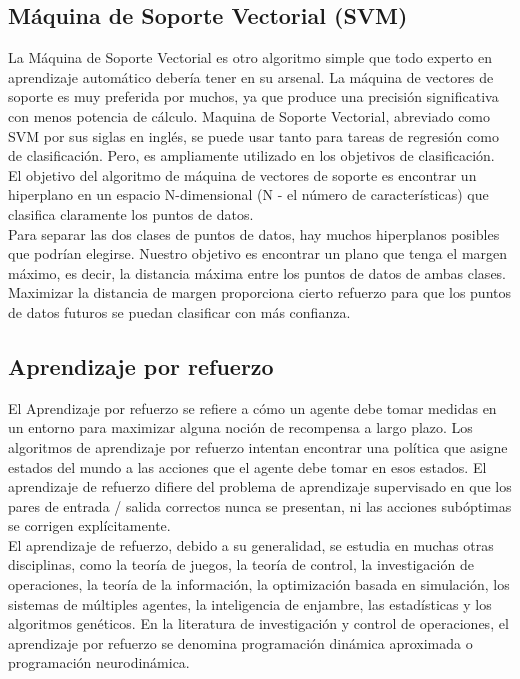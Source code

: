 \subsection{Máquina  de Soporte Vectorial (SVM)}
\noindent La Máquina de Soporte Vectorial es otro algoritmo simple que todo experto en aprendizaje automático debería tener en su arsenal. La máquina de vectores de soporte es muy preferida por muchos, ya que produce una precisión significativa con menos potencia de cálculo. Maquina de Soporte Vectorial, abreviado como SVM por sus siglas en inglés, se puede usar tanto para tareas de regresión como de clasificación. Pero, es ampliamente utilizado en los objetivos de clasificación. El objetivo del algoritmo de máquina de vectores de soporte es encontrar un hiperplano en un espacio N-dimensional (N - el número de características) que clasifica claramente los puntos de datos.\\

\noindent Para separar las dos clases de puntos de datos, hay muchos hiperplanos posibles que podrían elegirse. Nuestro objetivo es encontrar un plano que tenga el margen máximo, es decir, la distancia máxima entre los puntos de datos de ambas clases. Maximizar la distancia de margen proporciona cierto refuerzo para que los puntos de datos futuros se puedan clasificar con más confianza\cite{12}.\\
\subsection{Aprendizaje por refuerzo}
\noindent El Aprendizaje por refuerzo se refiere a cómo un agente debe tomar medidas en un entorno para maximizar alguna noción de recompensa a largo plazo. Los algoritmos de aprendizaje por refuerzo intentan encontrar una política que asigne estados del mundo a las acciones que el agente debe tomar en esos estados. El aprendizaje de refuerzo difiere del problema de aprendizaje supervisado en que los pares de entrada / salida correctos nunca se presentan, ni las acciones subóptimas se corrigen explícitamente.\\

\noindent El aprendizaje de refuerzo, debido a su generalidad, se estudia en muchas otras disciplinas, como la teoría de juegos, la teoría de control, la investigación de operaciones, la teoría de la información, la optimización basada en simulación, los sistemas de múltiples agentes, la inteligencia de enjambre, las estadísticas y los algoritmos genéticos. En la literatura de investigación y control de operaciones, el aprendizaje por refuerzo se denomina programación dinámica aproximada o programación neurodinámica.\\

